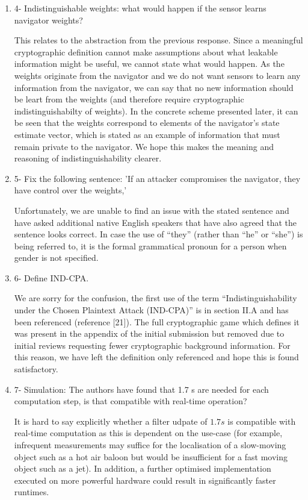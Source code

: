 \documentclass[a4paper]{scrartcl}
\newenvironment{rebuttal}{\begin{enumerate}[label={\color{grey}\thesection.\arabic{enumi}},leftmargin=0pt,ref=\thesection.\arabic{enumi}]}{\end{enumerate}}
\newcommand{\reviewtext}[1]{{\color{nblue} #1}}
\begin{document}
\begin{rebuttal}
\item \reviewtext{4- Indistinguishable weights: what would happen if the sensor learns navigator weights?}

This relates to the abstraction from the previous response. Since a meaningful cryptographic definition cannot make assumptions about what leakable information might be useful, we cannot state what would happen. As the weights originate from the navigator and we do not want sensors to learn any information from the navigator, we can say that no new information should be leart from the weights (and therefore require cryptographic indistinguishabilty of weights). In the concrete scheme presented later, it can be seen that the weights correspond to elements of the navigator's state estimate vector, which is stated as an example of information that must remain private to the navigator. We hope this makes the meaning and reasoning of indistinguishability clearer.

\item \reviewtext{5- Fix the following sentence: 'If an attacker compromises the navigator, they have control over the weights,'}

Unfortunately, we are unable to find an issue with the stated sentence and have asked additional native English speakers that have also agreed that the sentence looks correct. In case the use of ``they'' (rather than ``he'' or ``she'') is being referred to, it is the formal grammatical pronoun for a person when gender is not specified.

\item \reviewtext{6- Define IND-CPA.}

We are sorry for the confusion, the first use of the term ``Indistinguishability under the Chosen Plaintext Attack (IND-CPA)'' is in section II.A and has been referenced (reference [21]). The full cryptographic game which defines it was present in the appendix of the initial submission but removed due to initial reviews requesting fewer cryptographic background information. For this reason, we have left the definition only referenced and hope this is found satisfactory.

\item \reviewtext{7- Simulation: The authors have found that 1.7 s are needed for each
computation step, is that compatible with real-time operation?}

It is hard to say explicitly whether a filter udpate of $1.7s$ is compatible with real-time computation as this is dependent on the use-case (for example, infrequent measurements may suffice for the localisation of a slow-moving object such as a hot air baloon but would be insufficient for a fast moving object such as a jet). In addition, a further optimised implementation executed on more powerful hardware could result in significantly faster runtimes.


\end{rebuttal}
\end{document}

